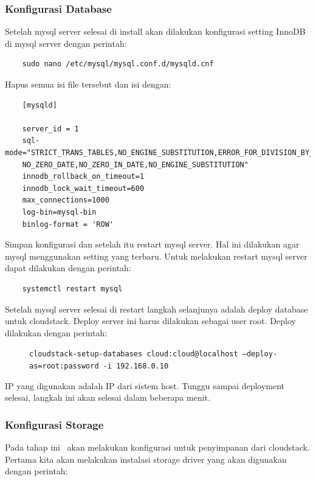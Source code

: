 \subsubsection{Konfigurasi Database}
Setelah mysql server selesai di install akan dilakukan konfigurasi setting InnoDB di mysql server dengan perintah:

\begin{verbatim}
    sudo nano /etc/mysql/mysql.conf.d/mysqld.cnf
\end{verbatim}

Hapus semua isi file tersebut dan isi dengan:

\begin{listing}[H]
    \begin{verbatim}
    [mysqld]

    server_id = 1
    sql-mode="STRICT_TRANS_TABLES,NO_ENGINE_SUBSTITUTION,ERROR_FOR_DIVISION_BY_ZERO
    NO_ZERO_DATE,NO_ZERO_IN_DATE,NO_ENGINE_SUBSTITUTION"
    innodb_rollback_on_timeout=1
    innodb_lock_wait_timeout=600
    max_connections=1000
    log-bin=mysql-bin
    binlog-format = 'ROW'
    \end{verbatim}
    \caption{Konfigurasi mysqld.cnf}
    \label{code:mysql_config}
\end{listing}

Simpan konfigurasi dan setelah itu restart mysql server. Hal ini dilakukan agar mysql menggunakan setting yang terbaru. Untuk melakukan restart mysql server dapat dilakukan dengan perintah:

\begin{verbatim}
    systemctl restart mysql
\end{verbatim}

Setelah mysql server selesai di restart langkah selanjunya adalah deploy database untuk cloudstack. Deploy server ini harus dilakukan sebagai user root. Deploy dilakukan dengan perintah:

\begin{figure}
    \texttt{cloudstack-setup-databases cloud:cloud@localhost --deploy-as=root:password -i 192.168.0.10}
\end{figure}

IP yang digunakan adalah IP dari sistem host. Tunggu sampai deployment selesai, langkah ini akan selesai dalam beberapa menit.

\subsubsection{Konfigurasi Storage}
Pada tahap ini \saya\ akan melakukan konfigurasi untuk penyimpanan dari cloudstack. Pertama kita akan melakukan instalasi storage driver yang akan digunakan dengan perintah:


